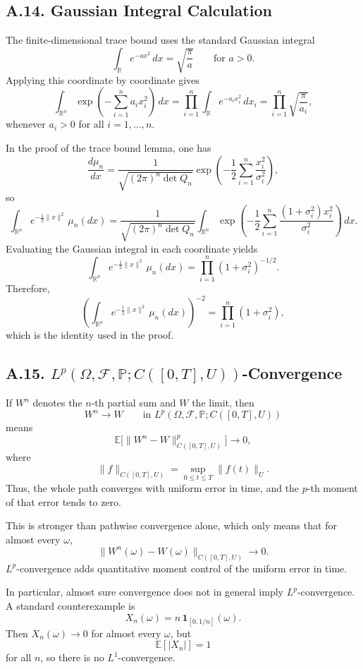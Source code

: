 \documentclass[11pt]{article}
\theoremstyle{definition}
\theoremstyle{remark}
\begin{document}
\subsection*{A.14. Gaussian Integral Calculation}
The finite-dimensional trace bound uses the standard Gaussian integral
\[
\int_{\mathbb R} e^{-a x^2}\,dx=\sqrt{\frac{\pi}{a}}
\qquad \text{for } a>0.
\]
Applying this coordinate by coordinate gives
\[
\int_{\mathbb R^n}\exp\left(-\sum_{i=1}^n a_i x_i^2\right)\,dx
=
\prod_{i=1}^n \int_{\mathbb R} e^{-a_i x_i^2}\,dx_i
=
\prod_{i=1}^n \sqrt{\frac{\pi}{a_i}},
\]
whenever \(a_i>0\) for all \(i=1,\dots,n\).

In the proof of the trace bound lemma, one has
\[
\frac{d\mu_n}{dx}
=
\frac{1}{\sqrt{(2\pi)^n\det Q_n}}
\exp\left(-\frac12\sum_{i=1}^n \frac{x_i^2}{\sigma_i^2}\right),
\]
so
\[
\int_{\mathbb R^n} e^{-\frac12\|x\|^2}\,\mu_n(dx)
=
\frac{1}{\sqrt{(2\pi)^n\det Q_n}}
\int_{\mathbb R^n}
\exp\left(
-\frac12\sum_{i=1}^n \frac{(1+\sigma_i^2)x_i^2}{\sigma_i^2}
\right)\,dx.
\]
Evaluating the Gaussian integral in each coordinate yields
\[
\int_{\mathbb R^n} e^{-\frac12\|x\|^2}\,\mu_n(dx)
=
\prod_{i=1}^n (1+\sigma_i^2)^{-1/2}.
\]
Therefore,
\[
\left(\int_{\mathbb R^n} e^{-\frac12\|x\|^2}\,\mu_n(dx)\right)^{-2}
=
\prod_{i=1}^n (1+\sigma_i^2),
\]
which is the identity used in the proof.

\subsection*{A.15. \(L^p(\Omega,\mathcal F,\mathbb P;C([0,T],U))\)-Convergence}
If \(W^n\) denotes the \(n\)-th partial sum and \(W\) the limit, then
\[
W^n \to W
\qquad \text{in } L^p(\Omega,\mathcal F,\mathbb P;C([0,T],U))
\]
means
\[
\mathbb E\bigl[\|W^n-W\|_{C([0,T],U)}^p\bigr]\to 0,
\]
where
\[
\|f\|_{C([0,T],U)}
=
\sup_{0\le t\le T}\|f(t)\|_U.
\]
\noindent
Thus, the whole path converges with uniform error in time, and the \(p\)-th moment of that error tends to zero.

This is stronger than pathwise convergence alone, which only means that for almost every \(\omega\),
\[
\|W^n(\omega)-W(\omega)\|_{C([0,T],U)}\to 0.
\]
\(L^p\)-convergence adds quantitative moment control of the uniform error in time.

In particular, almost sure convergence does not in general imply \(L^p\)-convergence. A standard counterexample is
\[
X_n(\omega)=n\,\mathbf 1_{[0,1/n]}(\omega).
\]
Then \(X_n(\omega)\to 0\) for almost every \(\omega\), but
\[
\mathbb E[|X_n|]=1
\]
for all \(n\), so there is no \(L^1\)-convergence.
\end{document}
